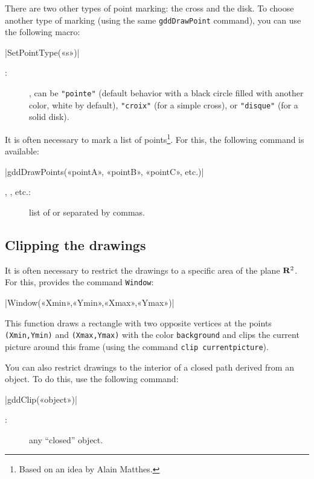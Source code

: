 \documentclass[a4paper,english]{article}
\begin{document}
There are two other types of point marking: the cross and the disk. To choose
another type of marking (using the same \lstinline+gddDrawPoint+ command), you
can use the following macro:
\begin{colourband}
  \macro|SetPointType(«s»)|
  \begin{description}
  \item[:] , can be \lstinline+"pointe"+
    (default behavior with a black circle filled with another color,
    white by default), \lstinline+"croix"+ (for a simple cross), or
    \lstinline+"disque"+ (for a solid disk).
  \end{description} 
\end{colourband}

It is often necessary to mark a list of points\footnote{Based on an idea by Alain Matthes.}. For this, the following command is available:

\begin{colourband}
\macro|gddDrawPoints(«pointA», «pointB», «pointC», etc.)|
\begin{description}
  \item[, , etc.:] list of  or
   separated by commas.
\end{description}
\end{colourband}

\subsection{Clipping the drawings}

It is often necessary to restrict the drawings to a specific area of the plane $\mathbf{R}^2$.
For this, \mpgeomdd provides the command \lstinline+Window+:
\begin{colourband}
\macro|Window(«Xmin»,«Ymin»,«Xmax»,«Ymax»)|
\end{colourband}
This function draws a rectangle with two opposite vertices at the points
\lstinline|(Xmin,Ymin)| and \lstinline|(Xmax,Ymax)| with the \MP{} color
\lstinline+background+ and clips the current picture around this frame (using the
\MP{} command \lstinline+clip currentpicture+).


You can also restrict drawings to the interior of a closed path derived from an \mpgeomdd object. To do this, use the following command:
\begin{colourband}
\macro|gddClip(«object»)|
\begin{description}
  \item[:] any \mpgeomdd \enquote{closed} object.
\end{description}
\end{colourband}
\end{document}
